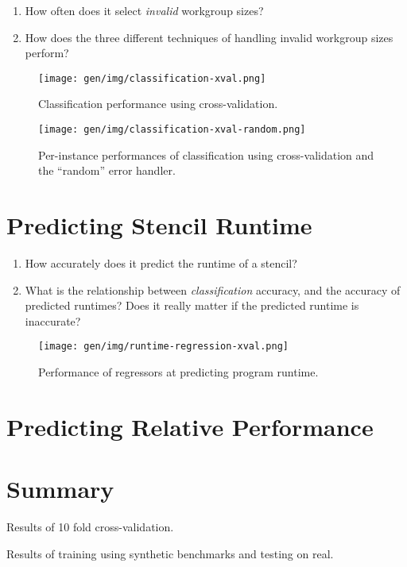 \begin{enumerate}
\item How often does it select \emph{invalid} workgroup sizes?
\item How does the three different techniques of handling invalid
  workgroup sizes perform?
\end{enumerate}

\begin{figure}
\centering
\texttt{[image: gen/img/classification-xval.png]}
\caption{%
  Classification performance using cross-validation.%
}
\end{figure}

\begin{figure}
\centering
\texttt{[image: gen/img/classification-xval-random.png]}
\caption{%
  Per-instance performances of classification using cross-validation
  and the ``random'' error handler.%
}
\end{figure}





\section{Predicting Stencil Runtime}

\begin{enumerate}
\item How accurately does it predict the runtime of a stencil?
\item What is the relationship between \emph{classification} accuracy,
  and the accuracy of predicted runtimes? Does it really matter if the
  predicted runtime is inaccurate?
\end{enumerate}

\begin{figure}
\centering
\texttt{[image: gen/img/runtime-regression-xval.png]}
\caption{%
  Performance of regressors at predicting program runtime.%
}
\end{figure}


\section{Predicting Relative Performance}


\section{Summary}

\begin{table}
\scriptsize

\caption{Results of 10 fold cross-validation.}
\end{table}

\begin{table}
\scriptsize

\caption{Results of training using synthetic benchmarks and testing on
  real.}
\end{table}
